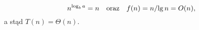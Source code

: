 % 
% 

\subsubsection{} %
\[
	n^{\log_ba} = n \quad\hbox{oraz}\quad f(n) = n/\!\lg n = O(n),
\]
a stąd $T(n)=\Theta(n)$.

